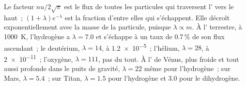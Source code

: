 Le facteur $n u/2\sqrt\pi$ est le flux de toutes les particules qui traversent
l' vers le haut~; $(1 + \lambda)e^{-\lambda}$ est la fraction d'entre elles
qui s'échappent. Elle décroît exponentiellement avec la masse de la particule, puisque
$\lambda \propto m$. À l' terrestre, à \qty{1000}{K}, l'hydrogène
a $\lambda = 7.0$ et s'échappe à un taux de 0.7\,\% de son flux
ascendant~; le deutérium, $\lambda = 14$, à \num{1.2e-5}~; l'hélium, $\lambda = 28$,
à \num{2e-11}~; l'oxygène, $\lambda = 111$, pas du tout. À l' de
Vénus, plus froide et tout aussi profonde dans le puits de gravité, $\lambda = 22$ même pour
l'hydrogène~; sur Mars, $\lambda = 5.4$~; sur Titan, $\lambda = 1.5$ pour l'hydrogène
et 3.0 pour le dihydrogène.

